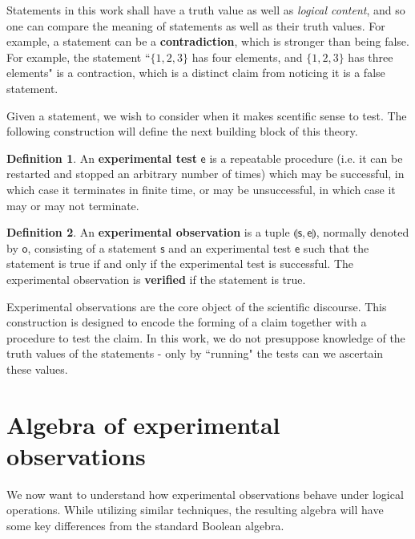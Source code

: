 \documentclass[review]{elsarticle}
\theoremstyle{plain}%
\theoremstyle{definition}
\newtheorem{defn}{Definition}[section]
\theoremstyle{remark}
\begin{document}
Statements in this work shall have a truth value as well as \textit{logical content}, and so one can compare the meaning of statements as well as their truth values. For example, a statement can be a \textbf{contradiction}, which is stronger than being false. For example, the statement ``$\{1,2,3\}$ has four elements, and $\{1,2,3\}$ has three elements" is a contraction, which is a distinct claim from noticing it is a false statement. 

Given a statement, we wish to consider when it makes scentific sense to test. The following construction will define the next building block of this theory. 

\begin{defn}
	An \textbf{experimental test} $\mathsf{e}$ is a repeatable procedure (i.e. it can be restarted and stopped an arbitrary number of times) which may be successful, in which case it terminates in finite time, or may be unsuccessful, in which case it may or may not terminate.
\end{defn}

\begin{defn}
	An \textbf{experimental observation} is a tuple $\llparenthesis \mathsf{s}, \mathsf{e} \rrparenthesis$, normally denoted by $\mathsf{o}$, consisting of a statement $\mathsf{s}$ and an experimental test $\mathsf{e}$ such that the statement is true if and only if the  experimental test is successful. The experimental observation is \textbf{verified} if the statement is true.
\end{defn}


Experimental observations are the core object of the scientific discourse. This construction is designed to encode the forming of a claim together with a procedure to test the claim. In this work, we do not presuppose knowledge of the truth values of the statements - only by ``running" the tests can we ascertain these values. 




\section{Algebra of experimental observations}

We now want to understand how experimental observations behave under logical operations. While utilizing similar techniques, the resulting algebra will have some key differences from the standard Boolean algebra.
\end{document}
